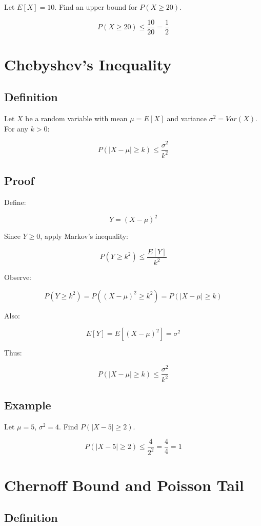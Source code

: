 \documentclass[12pt]{article}
\begin{document}
Let $E[X] = 10$. Find an upper bound for $P(X \ge 20)$.

\[
P(X \ge 20) \le \frac{10}{20} = \frac{1}{2}
\]

\section*{Chebyshev’s Inequality}

\subsection*{Definition}

Let $X$ be a random variable with mean $\mu = E[X]$ and variance $\sigma^2 = Var(X)$. For any $k > 0$:

\[
P(|X - \mu| \ge k) \le \frac{\sigma^2}{k^2}
\]

\subsection*{Proof}

Define:

\[
Y = (X - \mu)^2
\]

Since $Y \ge 0$, apply Markov’s inequality:

\[
P(Y \ge k^2) \le \frac{E[Y]}{k^2}
\]

Observe:

\[
P(Y \ge k^2) = P((X - \mu)^2 \ge k^2)
= P(|X - \mu| \ge k)
\]

Also:

\[
E[Y] = E[(X - \mu)^2] = \sigma^2
\]

Thus:

\[
P(|X - \mu| \ge k) \le \frac{\sigma^2}{k^2}
\]

\subsection*{Example}

Let $\mu = 5$, $\sigma^2 = 4$. Find $P(|X - 5| \ge 2)$.

\[
P(|X - 5| \ge 2) \le \frac{4}{2^2} = \frac{4}{4} = 1
\]

\section*{Chernoff Bound and Poisson Tail}

\subsection*{Definition}
\end{document}
